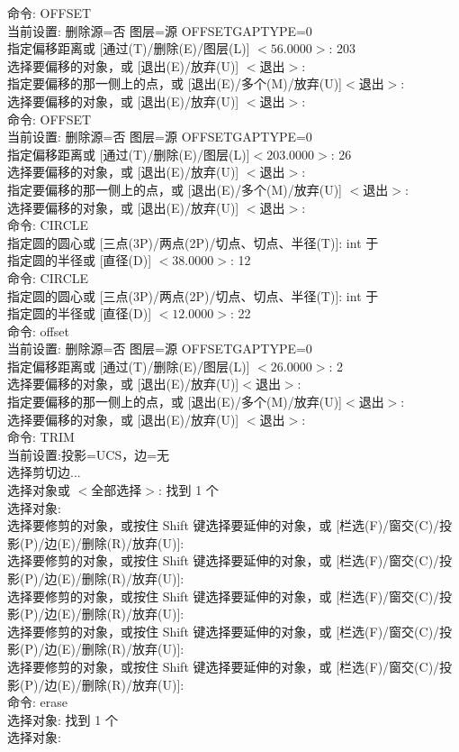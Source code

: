 命令: OFFSET\\
当前设置: 删除源=否  图层=源  OFFSETGAPTYPE=0\\
指定偏移距离或 [通过(T)/删除(E)/图层(L)] $<56.0000>$:  203\\
选择要偏移的对象，或 [退出(E)/放弃(U)] $<$退出$>$:\\
指定要偏移的那一侧上的点，或 [退出(E)/多个(M)/放弃(U)]$ <$退出$>$:\\
选择要偏移的对象，或 [退出(E)/放弃(U)] $<$退出$>$:\\
命令:  OFFSET\\
当前设置: 删除源=否  图层=源  OFFSETGAPTYPE=0\\
指定偏移距离或 [通过(T)/删除(E)/图层(L)]$ <203.0000>$:  26\\
选择要偏移的对象，或 [退出(E)/放弃(U)] $<$退出$>$:\\
指定要偏移的那一侧上的点，或 [退出(E)/多个(M)/放弃(U)] $<$退出$>$:\\
选择要偏移的对象，或 [退出(E)/放弃(U)] $<$退出$>$:\\
命令: CIRCLE \\
指定圆的圆心或 [三点(3P)/两点(2P)/切点、切点、半径(T)]: int 于\\
指定圆的半径或 [直径(D)] $<38.0000>$: 12\\
命令:  CIRCLE \\
指定圆的圆心或 [三点(3P)/两点(2P)/切点、切点、半径(T)]: int 于\\
指定圆的半径或 [直径(D)] $<12.0000>$: 22\\
命令: offset\\
当前设置: 删除源=否  图层=源  OFFSETGAPTYPE=0\\
指定偏移距离或 [通过(T)/删除(E)/图层(L)] $<26.0000>$:  2\\
选择要偏移的对象，或 [退出(E)/放弃(U)]$ <$退出$>$:\\
指定要偏移的那一侧上的点，或 [退出(E)/多个(M)/放弃(U)]$<$退出$>$:\\
选择要偏移的对象，或 [退出(E)/放弃(U)] $<$退出$>$:\\
命令: TRIM\\
当前设置:投影=UCS，边=无\\
选择剪切边...\\
选择对象或 $<$全部选择$>$:  找到 1 个\\
选择对象:\\
选择要修剪的对象，或按住 Shift 键选择要延伸的对象，或
[栏选(F)/窗交(C)/投影(P)/边(E)/删除(R)/放弃(U)]:\\
选择要修剪的对象，或按住 Shift 键选择要延伸的对象，或
[栏选(F)/窗交(C)/投影(P)/边(E)/删除(R)/放弃(U)]:\\
选择要修剪的对象，或按住 Shift 键选择要延伸的对象，或
[栏选(F)/窗交(C)/投影(P)/边(E)/删除(R)/放弃(U)]:\\
选择要修剪的对象，或按住 Shift 键选择要延伸的对象，或
[栏选(F)/窗交(C)/投影(P)/边(E)/删除(R)/放弃(U)]:\\
选择要修剪的对象，或按住 Shift 键选择要延伸的对象，或
[栏选(F)/窗交(C)/投影(P)/边(E)/删除(R)/放弃(U)]:\\
命令: erase\\
选择对象: 找到 1 个\\
选择对象:\\

